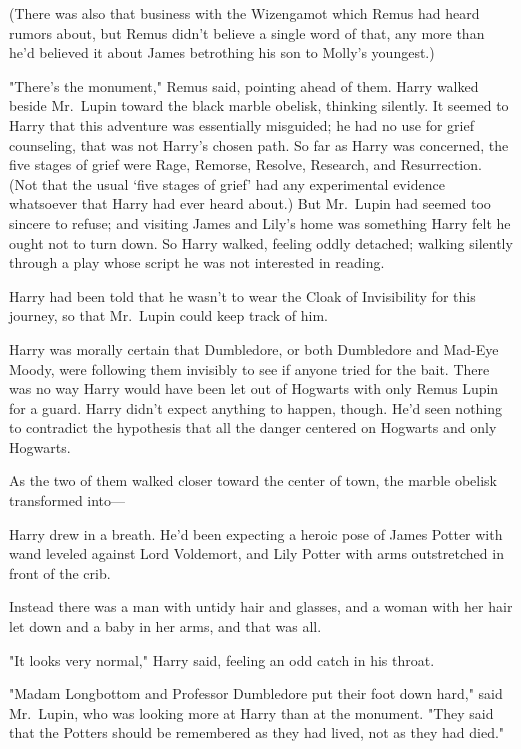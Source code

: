 (There was also that business with the Wizengamot which Remus had heard rumors
about, but Remus didn't believe a single word of that, any more than he'd
believed it about James betrothing his son to Molly's youngest.)

"There's the monument," Remus said, pointing ahead of them.
\sbreak
Harry walked beside Mr.~Lupin toward the black marble obelisk, thinking
silently. It seemed to Harry that this adventure was essentially misguided; he
had no use for grief counseling, that was not Harry's chosen path. So far as
Harry was concerned, the five stages of grief were Rage, Remorse, Resolve,
Research, and Resurrection. (Not that the usual `five stages of grief' had any
experimental evidence whatsoever that Harry had ever heard about.) But
Mr.~Lupin had seemed too sincere to refuse; and visiting James and Lily's home
was something Harry felt he ought not to turn down. So Harry walked, feeling
oddly detached; walking silently through a play whose script he was not
interested in reading.

Harry had been told that he wasn't to wear the Cloak of Invisibility for this
journey, so that Mr.~Lupin could keep track of him.

Harry was morally certain that Dumbledore, or both Dumbledore and Mad-Eye
Moody, were following them invisibly to see if anyone tried for the bait. There
was no way Harry would have been let out of Hogwarts with only Remus Lupin for
a guard. Harry didn't expect anything to happen, though. He'd seen nothing to
contradict the hypothesis that all the danger centered on Hogwarts and only
Hogwarts.

As the two of them walked closer toward the center of town, the marble obelisk
transformed into---

Harry drew in a breath. He'd been expecting a heroic pose of James Potter with
wand leveled against Lord Voldemort, and Lily Potter with arms outstretched in
front of the crib.

Instead there was a man with untidy hair and glasses, and a woman with her hair
let down and a baby in her arms, and that was all.

"It looks very{\el} normal," Harry said, feeling an odd catch in his throat.

"Madam Longbottom and Professor Dumbledore put their foot down hard," said
Mr.~Lupin, who was looking more at Harry than at the monument. "They said that
the Potters should be remembered as they had lived, not as they had died."

